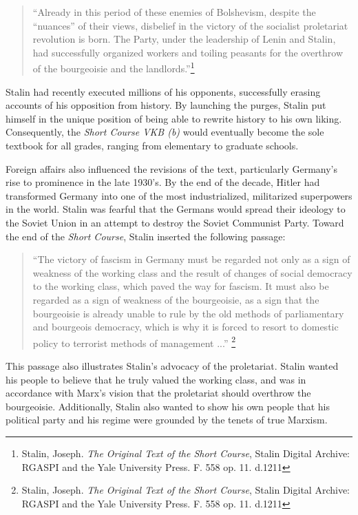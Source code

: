 \documentclass[a4paper, twocolumn]{article}
\begin{document}
\begin{quote}
``Already in this period of these enemies of Bolshevism, despite the ``nuances'' of their views, disbelief in the victory of the socialist proletariat revolution is born.
The Party, under the leadership of Lenin and Stalin, had successfully
organized workers and toiling peasants for the overthrow of the
bourgeoisie and the landlords.''\footnote{Stalin, Joseph. \emph{The Original Text of the Short Course}, Stalin Digital Archive: RGASPI and the Yale University Press.  F. 558 op. 11. d.1211}
\end{quote}

Stalin had recently executed millions of his opponents, successfully
erasing accounts of his opposition from history. By launching the
purges, Stalin put himself in the unique position of being able to
rewrite history to his own liking. Consequently, the \emph{Short Course
VKB (b)} would eventually become the sole textbook for all grades,
ranging from elementary to graduate schools.

Foreign affairs also influenced the revisions of the text,
particularly Germany's rise to prominence in the late 1930's. By the
end of the decade, Hitler had transformed Germany into one of the most
industrialized, militarized superpowers in the world. Stalin was
fearful that the Germans would spread their ideology to the Soviet
Union in an attempt to destroy the Soviet Communist Party. Toward the end of
the \emph{Short Course}, Stalin inserted the following passage:

\begin{quote}
``The victory of fascism in Germany must be regarded not only as a sign
of weakness of the working class and the result of changes of social
democracy to the working class, which paved the way for fascism. It
must also be regarded as a sign of weakness of the bourgeoisie, as a
sign that the bourgeoisie is already unable to rule by the old methods
of parliamentary and bourgeois democracy, which is why it is forced
to resort to domestic policy to terrorist methods of management
...'' \footnote{Stalin, Joseph. \emph{The Original Text of the Short Course}, Stalin Digital Archive: RGASPI and the Yale University Press.  F. 558 op. 11. d.1211}
\end{quote}

This passage also illustrates Stalin's advocacy of the
proletariat. Stalin wanted his people to believe that he truly valued
the working class, and was in accordance with Marx's vision that the
proletariat should overthrow the bourgeoisie. Additionally, Stalin
also wanted to show his own people that his political party and his
regime were grounded by the tenets of true Marxism.
\end{document}
